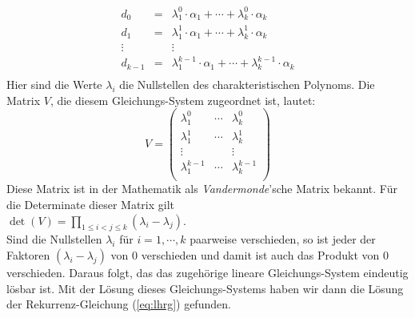 \[
\begin{array}{lcl}
  d_0     & = & \lambda_1^0 \cdot \alpha_1 + \cdots +   \lambda_k^0 \cdot \alpha_k \\[0.1cm]
  d_1     & = & \lambda_1^1 \cdot \alpha_1 + \cdots +   \lambda_k^1 \cdot \alpha_k \\[0.1cm]
  \vdots  &   & \vdots                                                   \\[0.1cm]
  d_{k-1} & = & \lambda_1^{k-1} \cdot \alpha_1 + \cdots +   \lambda_{k}^{k-1} \cdot \alpha_k \\[0.1cm]
\end{array}
\]
Hier sind die Werte $\lambda_i$  die Nullstellen des charakteristischen Polynoms.  
Die Matrix $V$, die diesem Gleichungs-System
zugeordnet ist, lautet: 
\[
V = \left(
\begin{array}{lcl}
  \lambda_1^0  & \cdots &   \lambda_k^0 \\[0.1cm]
  \lambda_1^1  & \cdots &   \lambda_k^1 \\[0.1cm]
  \vdots         &         & \vdots \\[0.1cm]
  \lambda_1^{k-1} & \cdots &   \lambda_{k}^{k-1} \\[0.1cm]
\end{array}\right)
\]
Diese Matrix ist in der Mathematik als \emph{Vandermonde}'sche Matrix bekannt.  F\"ur die
Determinate dieser Matrix gilt \\[0.1cm]
\hspace*{1.3cm} $\det(V) = \prod\limits_{1 \leq i < j \leq k} (\lambda_i - \lambda_j)$. \\[0.1cm]
Sind die Nullstellen $\lambda_i$ f\"ur $i=1,\cdots,k$ paarweise verschieden, so ist jeder
der Faktoren $(\lambda_i - \lambda_j)$ von 0 verschieden und damit ist auch das Produkt
von 0 verschieden.  Daraus folgt, das das zugeh\"orige lineare Gleichungs-System eindeutig
l\"osbar ist.  Mit der L\"osung dieses Gleichungs-Systems
 haben wir dann die L\"osung der Rekurrenz-Gleichung (\ref{eq:lhrg}) gefunden.
\vspace*{0.1cm}

